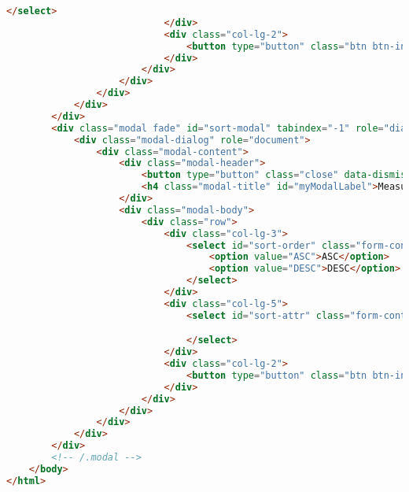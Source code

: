 \begin{lstlisting}[language=HTML,basicstyle=\tiny,caption=reporting.html]
                                </select>
                            </div>
                            <div class="col-lg-2">
                                <button type="button" class="btn btn-info btn-block" onclick="addMeasure()">Add</button>
                            </div>
                        </div>
                    </div>
                </div>
            </div>
        </div>
        <div class="modal fade" id="sort-modal" tabindex="-1" role="dialog" aria-labelledby="SortModal">
            <div class="modal-dialog" role="document">
                <div class="modal-content">
                    <div class="modal-header">
                        <button type="button" class="close" data-dismiss="modal" aria-label="Close"><span aria-hidden="true">&times;</span></button>
                        <h4 class="modal-title" id="myModalLabel">Measure</h4>
                    </div>
                    <div class="modal-body">
                        <div class="row">
                            <div class="col-lg-3">
                                <select id="sort-order" class="form-control">
                                    <option value="ASC">ASC</option>
                                    <option value="DESC">DESC</option>
                                </select>
                            </div>
                            <div class="col-lg-5">
                                <select id="sort-attr" class="form-control">

                                </select>
                            </div>
                            <div class="col-lg-2">
                                <button type="button" class="btn btn-info btn-block" onclick="addSort()">Add</button>
                            </div>
                        </div>
                    </div>
                </div>
            </div>
        </div>
        <!-- /.modal -->
    </body>
</html>
\end{lstlisting}

